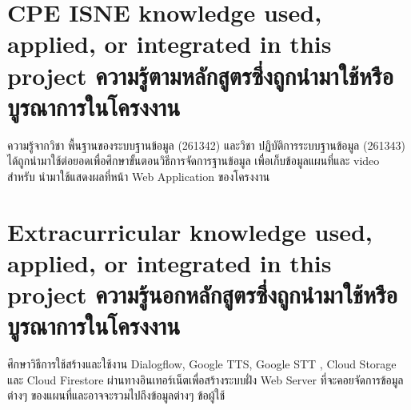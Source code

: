 \section{\ifenglish%
    \ifcpe CPE \else ISNE \fi knowledge used, applied, or integrated in this project
  \else%
    ความรู้ตามหลักสูตรซึ่งถูกนำมาใช้หรือบูรณาการในโครงงาน
  \fi
}
ความรู้จากวิชา พื้นฐานของระบบฐานข้อมูล (261342) และวิชา ปฏิบัติการระบบฐานข้อมูล
(261343) ได้ถูกนำมาใช้ต่อยอดเพื่อศึกษาขั้นตอนวิธีการจัดการฐานข้อมูล เพื่อเก็บข้อมูลแผนที่และ video สำหรับ
นำมาใช้แสดงผลที่หน้า Web Application ของโครงงาน

\section{\ifenglish%
    Extracurricular knowledge used, applied, or integrated in this project
  \else%
    ความรู้นอกหลักสูตรซึ่งถูกนำมาใช้หรือบูรณาการในโครงงาน
  \fi
}

ศึกษาวิธีการใช้สร้างและใช้งาน Dialogflow, Google TTS, Google STT , Cloud Storage 
และ Cloud Firestore ผ่านทางอินเทอร์เน็ตเพื่อสร้างระบบฝั่ง Web Server ที่จะคอยจัดการข้อมูลต่างๆ
ของแผนที่และอาจจะรวมไปถึงข้อมูลต่างๆ ข้อผู้ใช้
